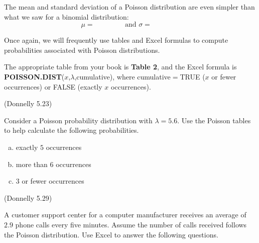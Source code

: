 \documentclass[12pt, letterpaper]{article}
\newcounter{exercise}
\theoremstyle{definition}
\begin{document}
\begin{statement}

The mean and standard deviation of a Poisson distribution are even simpler than what we saw for a binomial distribution:
$$ \mu = ~~~~~~~~~~~~~~~~~~\text{ and } \sigma=  ~~~~~~~~~~~~~~~~~~ $$

\vspace*{.1in}

Once again, we will frequently use tables and Excel formulas to compute probabilities associated with Poisson distributions.

\vspace*{.1in}

The appropriate table from your book is \textbf{Table 2}, and the Excel formula is \textbf{POISSON.DIST}($x$,$\lambda$,cumulative), where cumulative$=$TRUE ($x$ or fewer occurrences) or FALSE (exactly $x$ occurrences).
\end{statement}

\vfill

\newpage

\begin{exercise}  (Donnelly 5.23)

Consider a Poisson probability distribution with $\lambda=5.6$.  Use the Poisson tables to help calculate the following probabilities.

\end{exercise}

\begin{enumerate}[(a)]

\item exactly $5$ occurrences

\vfill

\item more than $6$ occurrences

\vfill

\item $3$ or fewer occurrences

\vfill

\end{enumerate}


\begin{exercise}  (Donnelly 5.29)

A customer support center for a computer manufacturer receives an average of $2.9$ phone calls every five minutes.  Assume the number of calls received follows the Poisson distribution.  Use Excel to answer the following questions.

\end{exercise}
\end{document}
